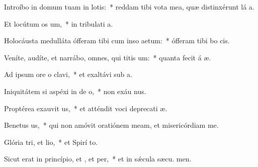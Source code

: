 \item Introíbo in domum tuam in lotis:~* reddam tibi vota mea, quæ distinxérunt lá a.
\item Et locútum  os um,~* in tribulati a.
\item Holocáusta medulláta ófferam tibi cum inso aetum:~* ófferam tibi bo  cis.
\item Veníte, audíte, et narrábo, omnes, qui titis um:~* quanta fecit á æ.
\item Ad ipsum ore o clavi,~* et exaltávi sub  a.
\item Iniquitátem si aspéxi in de o,~* non exáu nus.
\item Proptérea exauvit us,~* et atténdit voci deprecati æ.
\item Benetus us,~* qui non amóvit oratiónem meam, et misericórdiam   me.
\item Glória tri, et lio,~* et Spirí to.
\item Sicut erat in princípio, et , et per,~* et in sǽcula sæcu. men.
